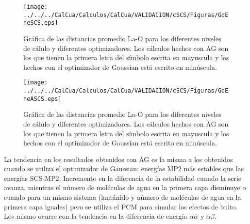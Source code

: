 \begin{figure}[h]
\centering
\texttt{[image: ../../../CalCua/Calculos/CalCua/VALIDACION/cSCS/Figuras/GdEneSCS.eps]}
\caption{\small{Gr\'afica de las distancias promedio La-O para los
diferentes niveles de c\'alulo y diferentes optimizadores. Los 
c\'alculos hechos con AG son los que tienen la primera letra del 
s\'imbolo escrita en mayuscula y los hechos con el optimizador de 
Gaussian est\'a escrito en min\'uscula.}}
\label{fig12}
\end{figure}
\begin{figure}[h]
\centering
\texttt{[image: ../../../CalCua/Calculos/CalCua/VALIDACION/cSCS/Figuras/GdEneASCS.eps]}
\caption{\small{Gr\'afica de las distancias promedio La-O para los
diferentes niveles de c\'alulo y diferentes optimizadores. Los 
c\'alculos hechos con AG son los que tienen la primera letra del 
s\'imbolo escrita en mayuscula y los hechos con el optimizador de 
Gaussian est\'a escrito en min\'uscula.}}
\label{fig121}
\end{figure}
La tendencia en los resultados obtenidos con AG es la misma a los
obtenidos cuando se utiliza el optimizador de Gaussian: energ\'ias 
MP2 m\'as estables que las energ\'ias SCS-MP2. Incremento en la 
diferencia de la estabilidad cuando la serie avanza, mientras el
n\'umero de mol\'eculas de agua en la primera capa disminuye o cuando
para un mismo sistema (lant\'anido y n\'umero de mol\'eculas de agua
en la primera capa iguales) pero se utiliza el PCM para simular los
efectos de bulto. Los mismo ocurre con la tendencia en la diferencia 
de energ\'ia $\alpha\alpha$ y $\alpha\beta$.


